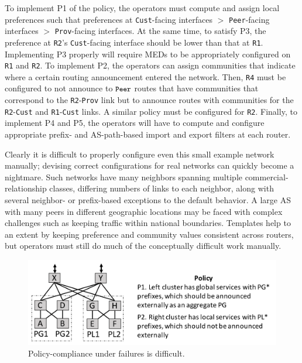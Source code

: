\documentclass[10pt]{sigalternate052015}
\newcommand{\sysname}{{\small \sf Propane}\xspace}
\newcommand{\CD}[1]{\texttt{\small #1}}  %
\begin{document}
To implement P1 of the policy, the operators must compute and assign
local preferences such that preferences at \CD{Cust}-facing interfaces
$>$ \CD{Peer}-facing interfaces $>$ \CD{Prov}-facing interfaces. At
the same time, to satisfy P3, the preference at \CD{R2}'s
\CD{Cust}-facing interface should be lower than that at
\CD{R1}. Implementing P3 properly will require MEDs to be appropriately configured on \CD{R1} and \CD{R2}. 
To implement P2, the operators can assign communities that
indicate where a certain routing announcement entered the
network. Then, \CD{R4} must be configured to not announce to
$\CD{Peer}$ routes that have communities that correspond to the
\CD{R2}-\CD{Prov} link but to announce routes with communities for the \CD{R2}-\CD{Cust} and \CD{R1}-\CD{Cust} links. A similar policy must be configured for \CD{R2}. Finally, to implement P4 and P5, the operators will have to compute and configure appropriate prefix- and AS-path-based import and export filters at each router.

Clearly it is difficult to properly configure even this
small example network manually; devising correct configurations for real networks can quickly become a nightmare. Such networks have many neighbors spanning multiple commercial-relationship classes, differing numbers of links to each neighbor, along with several neighbor- or prefix-based exceptions to the default behavior. A large AS with many peers in different geographic locations may be faced with complex challenges such as keeping traffic within national boundaries.
Templates help to an extent by keeping preference and community values consistent across routers, but operators must still do much of the conceptually difficult work manually. 

\begin{figure}[t!]
  \centering
  \includegraphics[width=\columnwidth]{figures/example2}
  \caption{Policy-compliance under failures is difficult.}
  \label{fig:example2}
  \vspace{-1em}
\end{figure}
\end{document}
